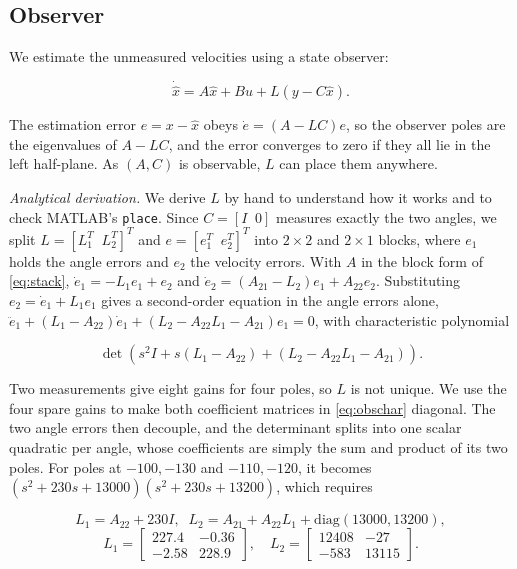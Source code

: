 \subsection{Observer}
\begin{rw}
We estimate the unmeasured velocities using a state observer:
\end{rw}
\begin{equation}
\dot{\hat x}=A\hat x+Bu+L\left(y-C\hat x\right).
\end{equation}
\begin{rw}
The estimation error $e=x-\hat x$ obeys $\dot e=(A-LC)e$, so the observer poles are the eigenvalues of $A-LC$, and the error converges to zero if they all lie in the left half-plane. As $(A,C)$ is observable, $L$ can place them anywhere.

\emph{Analytical derivation.} We derive $L$ by hand to understand how it works and to check MATLAB's \texttt{place}. Since $C=[I\;\;0]$ measures exactly the two angles, we split $L=[L_1^T\;\;L_2^T]^T$ and $e=[e_1^T\;\;e_2^T]^T$ into $2\times2$ and $2\times1$ blocks, where $e_1$ holds the angle errors and $e_2$ the velocity errors. With $A$ in the block form of \eqref{eq:stack}, $\dot e_1=-L_1e_1+e_2$ and $\dot e_2=(A_{21}-L_2)e_1+A_{22}e_2$. Substituting $e_2=\dot e_1+L_1e_1$ gives a second-order equation in the angle errors alone, $\ddot e_1+(L_1-A_{22})\dot e_1+(L_2-A_{22}L_1-A_{21})e_1=0$, with characteristic polynomial
\end{rw}
\begin{equation}
\det\!\left(s^2I+s(L_1-A_{22})+(L_2-A_{22}L_1-A_{21})\right). \label{eq:obschar}
\end{equation}
\begin{rw}
Two measurements give eight gains for four poles, so $L$ is not unique. We use the four spare gains to make both coefficient matrices in \eqref{eq:obschar} diagonal. The two angle errors then decouple, and the determinant splits into one scalar quadratic per angle, whose coefficients are simply the sum and product of its two poles. For poles at $-100,-130$ and $-110,-120$, it becomes $(s^2+230s+13000)(s^2+230s+13200)$, which requires
\end{rw}
\begin{equation}
L_1=A_{22}+230I,\;\; L_2=A_{21}+A_{22}L_1+\mathrm{diag}(13000,13200),
\end{equation}
\begin{equation}
L_1=\begin{bmatrix}227.4&-0.36\\-2.58&228.9\end{bmatrix},\quad L_2=\begin{bmatrix}12408&-27\\-583&13115\end{bmatrix}.
\end{equation}
